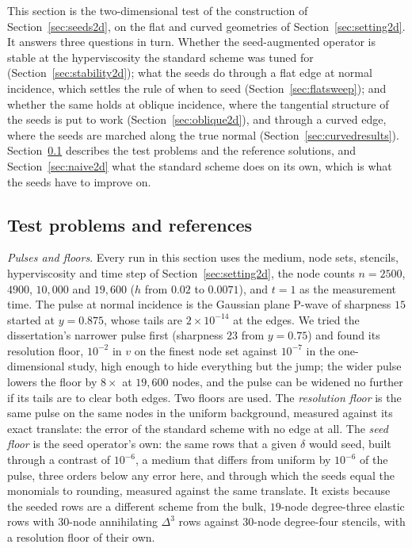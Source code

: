 \documentclass[11pt]{amsart}
\theoremstyle{definition}
\theoremstyle{remark}
\newcommand{\para}[1]{\par\smallskip\noindent\textit{#1}.\enspace}
\begin{document}
This section is the two-dimensional test of the construction of
Section~\ref{sec:seeds2d}, on the flat and curved geometries of
Section~\ref{sec:setting2d}. It answers three questions in turn. Whether
the seed-augmented operator is stable at the hyperviscosity the standard
scheme was tuned for (Section~\ref{sec:stability2d}); what the seeds do
through a flat edge at normal incidence, which settles the rule of when
to seed (Section~\ref{sec:flatsweep}); and whether the same holds at
oblique incidence, where the tangential structure of the seeds is put to
work (Section~\ref{sec:oblique2d}), and through a curved edge, where the
seeds are marched along the true normal (Section~\ref{sec:curvedresults}).
Section~\ref{sec:tests2d} describes the test problems and the reference
solutions, and Section~\ref{sec:naive2d} what the standard scheme does on
its own, which is what the seeds have to improve on.

\subsection{Test problems and references}
\label{sec:tests2d}
\para{Pulses and floors}
Every run in this section uses the medium, node sets, stencils,
hyperviscosity and time step of Section~\ref{sec:setting2d}, the node
counts $n = 2500$, $4900$, $10{,}000$ and $19{,}600$ ($h$ from $0.02$ to
$0.0071$), and $t = 1$ as the measurement time. The pulse at normal
incidence is the Gaussian plane P-wave of sharpness $15$ started at
$y = 0.875$, whose tails are $2 \times 10^{-14}$ at the edges. We tried
the dissertation's narrower pulse first (sharpness $23$ from $y = 0.75$)
and found its resolution floor, $10^{-2}$ in $v$ on the finest node set
against $10^{-7}$ in the one-dimensional study, high enough to hide
everything but the jump; the wider pulse lowers the floor by $8\times$ at
$19{,}600$ nodes, and the pulse can be widened no further if its tails
are to clear both edges. Two floors are used. The
\emph{resolution floor} is the same pulse on the same nodes in the
uniform background, measured against its exact translate: the error of
the standard scheme with no edge at all. The \emph{seed floor} is the
seed operator's own: the same rows that a given $\delta$ would seed,
built through a contrast of $10^{-6}$, a medium that differs from
uniform by $10^{-6}$ of the pulse, three orders below any error here, and
through which the seeds equal the monomials to rounding, measured against
the same translate. It exists
because the seeded rows are a different scheme from the bulk, $19$-node
degree-three elastic rows with $30$-node annihilating $\Delta^3$ rows
against $30$-node degree-four stencils, with a resolution floor of their
own.
\end{document}

